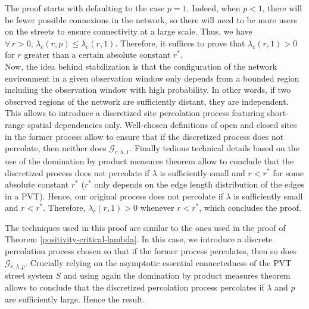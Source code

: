 \documentclass[conference]{IEEEtran}
\begin{document}
\begin{IEEEproof}
The proof starts with defaulting to the case $p=1$. Indeed, when $p<1$, there will be fewer possible connexions in the network, so there will need to be more users on the streets to ensure connectivity at a large scale. Thus, we have $\forall \, r > 0, \, \lambda_{c}(r,p) \leq \lambda_{c}(r,1)$. Therefore, it suffices to prove that $\lambda_{c}(r,1) > 0$ for $r$ greater than a certain absolute constant $r^{*}$.   \\
\indent Now, the idea behind stabilization is that the configuration of the network environment in a given observation window only depends from a bounded region including the observation window with high probability. In other words, if two observed regions of the network are sufficiently distant, they are independent. This allows to introduce a discretized site percolation process featuring short-range spatial dependencies only. Well-chosen definitions of open and closed sites in the former process allow to ensure that if the discretized process does not percolate, then neither does $\mathcal{G}_{r,\lambda,1}$. Finally tedious technical details based on the use of the domination by product measures theorem \cite{liggett1997domination} allow to conclude that the discretized process does not percolate if $\lambda$ is sufficiently small and $r < r^{*}$ for some absolute constant $r^{*}$ ($r^{*}$ only depends on the edge length distribution of the edges in a PVT). Hence, our original process does not percolate if $\lambda$ is sufficiently small and $r < r^{*}$. Therefore, $\lambda_{c}(r,1) > 0$ whenever $r < r^{*}$, which concludes the proof.
\end{IEEEproof}

\vspace{1\baselineskip}

\begin{IEEEproof}
The techniques used in this proof are similar to the ones used in the proof of Theorem \ref{positivity-critical-lambda}. In this case, we introduce a discrete percolation process chosen so that if the former process percolates, then so does $\mathcal{G}_{r,\lambda,p}$. Crucially relying on the asymptotic essential connectedness \cite{hirsch_continuum_2017} of the PVT street system $S$ and using again the domination by product measures theorem \cite{liggett1997domination} allows to conclude that the discretized percolation process percolates if $\lambda$ and $p$ are sufficiently large. Hence the result.
\end{IEEEproof}
\end{document}
